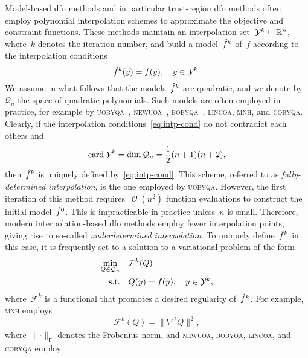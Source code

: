 \documentclass[draft]{article}
\numberwithin{equation}{section}
\theoremstyle{definition}
\theoremstyle{plain}
\DeclareMathOperator{\bigo}{\mathcal{O}}
\DeclareMathOperator{\card}{card}
\newcommand*{\norm}[2][]{#1\lVert#2#1\rVert}
\newcommand*{\obj}{f}
\newcommand*{\objm}[1][]{\hat{\obj}\ifblank{#1}{}{^{#1}}}
\newcommand*{\qpoly}{\mathcal{Q}_n}
\newcommand*{\R}{\mathbb{R}}
\newcommand*{\solvername}[1]{\textsc{#1}\xspace}
\newcommand*{\xpt}[1][]{\mathcal{Y}\ifblank{#1}{}{^{#1}}}
\begin{document}
Model-based \gls{dfo} methods and in particular trust-region \gls{dfo} methods often employ polynomial interpolation schemes to approximate the objective and constraint functions.
These methods maintain an interpolation set~$\xpt[k] \subseteq \R^n$, where~$k$ denotes the iteration number, and build a model~$\objm[k]$ of~$\obj$ according to the interpolation conditions
\begin{equation}
    \label{eq:intp-cond}
    \objm[k](y) = \obj(y), \quad y \in \xpt[k].
\end{equation}
We assume in what follows that the models~$\objm[k]$ are quadratic, and we denote by~$\qpoly$ the space of quadratic polynomials.
Such models are often employed in practice, for example by \solvername{uobyqa}~\cite{Powell_2002}, \solvername{newuoa}~\cite{Powell_2006}, \solvername{bobyqa}~\cite{Powell_2009}, \solvername{lincoa}, \solvername{mnh}, and \solvername{cobyqa}.
Clearly, if the interpolation conditions~\eqref{eq:intp-cond} do not contradict each others and
\begin{equation*}
    \card\xpt[k] = \dim\qpoly = \frac{1}{2} (n + 1) (n + 2),
\end{equation*}
then~$\objm[k]$ is uniquely defined by~\eqref{eq:intp-cond}.
This scheme, referred to as \emph{fully-determined interpolation}, is the one employed by \solvername{uobyqa}.
However, the first iteration of this method requires~$\bigo(n^2)$ function evaluations to construct the initial model~$\objm[0]$.
This is impracticable in practice unless~$n$ is small.
Therefore, modern interpolation-based \gls{dfo} methods employ fewer interpolation points, giving rise to so-called \emph{underdetermined interpolation}.
To uniquely define~$\objm[k]$ in this case, it is frequently set to a solution to a variational problem of the form
\begin{equation}
    \label{eq:intp-var}
    \begin{aligned}
        \min_{Q \in \qpoly} & \quad \mathcal{F}^k(Q)\\
        \text{s.t.}         & \quad Q(y) = \obj(y), \quad y \in \xpt[k],
    \end{aligned}
\end{equation}
where~$\mathcal{F}^k$ is a functional that promotes a desired regularity of~$\objm[k]$.
For example, \solvername{mnh} employs
\begin{equation}
    \label{eq:mnh}
    \mathcal{F}^k(Q) = \norm[\big]{\nabla^2 Q}_{\mathsf{F}}^2,
\end{equation}
where~$\norm{\cdot}_{\mathsf{F}}$ denotes the Frobenius norm, and \solvername{newuoa}, \solvername{bobyqa}, \solvername{lincoa}, and \solvername{cobyqa} employ
\end{document}
